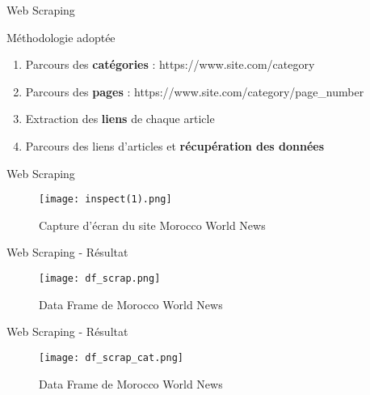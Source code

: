 \documentclass[10pt,sans,usenames,dvipsnames,english,compress]{beamer}
\begin{document}
\begin{frame}{Web Scraping}
	\begin{exampleblock}{Méthodologie adoptée}
		\begin{enumerate}
             \item Parcours des \textbf{catégories} : https://www.site.com/category
            \item Parcours des \textbf{pages} : https://www.site.com/category/page\_number
            \item Extraction des \textbf{liens} de chaque article
            \item Parcours des liens d'articles et \textbf{récupération des données}
            \end{enumerate}
	\end{exampleblock}
\end{frame}

\begin{frame}{Web Scraping}
\begin{figure}[!h]
    \centering
    \texttt{[image: inspect(1).png]}
    \caption{Capture d'écran du site Morocco World News}
\end{figure}
\end{frame}

\begin{frame}{Web Scraping - Résultat}
    \begin{figure}[!h]
    \centering
    \texttt{[image: df\_scrap.png]}
    \caption{Data Frame de Morocco World News}
    \end{figure}
\end{frame}

\begin{frame}{Web Scraping - Résultat}
    \begin{figure}[!h]
    \centering
    \texttt{[image: df\_scrap\_cat.png]}
    \caption{Data Frame de Morocco World News}
    \end{figure}
\end{frame}
\end{document}
